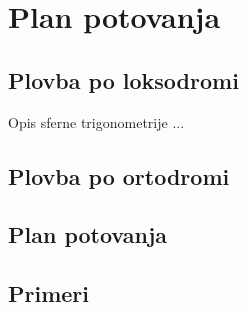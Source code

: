 \chapter{Plan potovanja}

\section{Plovba po loksodromi}
Opis sferne trigonometrije ...

\section{Plovba po ortodromi}

\section{Plan potovanja}

\section{Primeri}